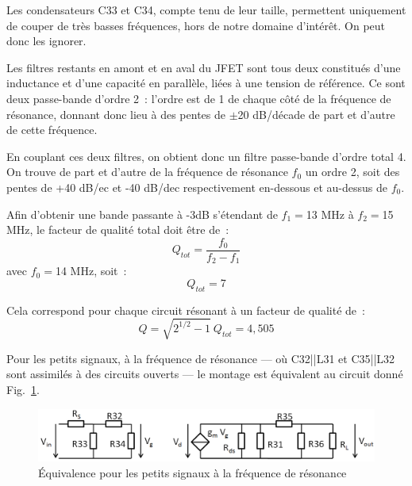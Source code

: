 \documentclass{article}
\begin{document}

Les condensateurs C33 et C34, compte tenu de leur taille, permettent uniquement de couper de très basses fréquences, hors de notre domaine d'intérêt. On peut donc les ignorer.

Les filtres restants en amont et en aval du JFET sont tous deux constitués d'une inductance et d'une capacité en parallèle, liées à une tension de référence. Ce sont deux passe-bande d'ordre 2~: l'ordre est de 1 de chaque côté de la fréquence de résonance, donnant donc lieu à des pentes de $\pm$20 dB/décade de part et d'autre de cette fréquence.

En couplant ces deux filtres, on obtient donc un filtre passe-bande d'ordre total 4. On trouve de part et d'autre de la fréquence de résonance $f_0$ un ordre 2, soit des pentes de +40 dB/ec et -40 dB/dec respectivement en-dessous et au-dessus de $f_0$.



Afin d'obtenir une bande passante à -3dB s'étendant de $f_1 = $13 MHz à $f_2 = $15 MHz, le facteur de qualité total doit être de~:
\begin{equation*}
Q_{tot} = \frac{f_0}{f_2-f_1}
\end{equation*}
avec $f_0 = $14 MHz, soit~:
\begin{equation*}
Q_{tot} = 7
\end{equation*}

Cela correspond pour chaque circuit résonant à un facteur de qualité de~:
\begin{equation*}
Q = \sqrt{2^{1/2}-1}~Q_{tot} = 4,505
\end{equation*}




Pour les petits signaux, à la fréquence de résonance --- où C32||L31 et C35||L32 sont assimilés à des circuits ouverts --- le montage est équivalent au circuit donné Fig.~\ref{fig:eqFET}.

\begin{figure}[h]
	\centering
	\includegraphics[width=.8\textwidth]{eqFet}
	\caption{Équivalence pour les petits signaux à la fréquence de résonance}
	\label{fig:eqFET}
\end{figure}
\end{document}

